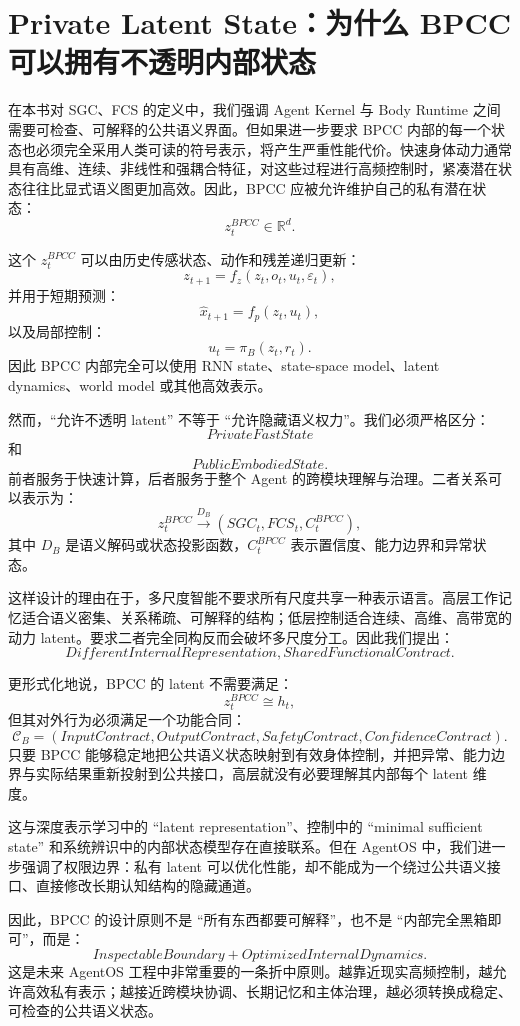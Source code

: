 \section{Private Latent State：为什么 BPCC 可以拥有不透明内部状态}

在本书对 SGC、FCS 的定义中，我们强调 Agent Kernel 与 Body Runtime 之间需要可检查、可解释的公共语义界面。但如果进一步要求 BPCC 内部的每一个状态也必须完全采用人类可读的符号表示，将产生严重性能代价。快速身体动力通常具有高维、连续、非线性和强耦合特征，对这些过程进行高频控制时，紧凑潜在状态往往比显式语义图更加高效。因此，BPCC 应被允许维护自己的私有潜在状态：
\[
\boxed{
z_t^{BPCC}
\in
\mathbb R^d.
}
\]

这个 $z_t^{BPCC}$ 可以由历史传感状态、动作和残差递归更新：
\[
z_{t+1}
=
f_z
\left(
z_t,
o_t,
u_t,
\varepsilon_t
\right),
\]
并用于短期预测：
\[
\hat x_{t+1}
=
f_p(z_t,u_t),
\]
以及局部控制：
\[
u_t
=
\pi_B(z_t,r_t).
\]
因此 BPCC 内部完全可以使用 RNN state、state-space model、latent dynamics、world model 或其他高效表示。

然而，``允许不透明 latent'' 不等于 ``允许隐藏语义权力''。我们必须严格区分：
\[
PrivateFastState
\]
和
\[
PublicEmbodiedState.
\]
前者服务于快速计算，后者服务于整个 Agent 的跨模块理解与治理。二者关系可以表示为：
\[
z_t^{BPCC}
\xrightarrow{D_B}
(
SGC_t,FCS_t,C_t^{BPCC}
),
\]
其中 $D_B$ 是语义解码或状态投影函数，$C_t^{BPCC}$ 表示置信度、能力边界和异常状态。

这样设计的理由在于，多尺度智能不要求所有尺度共享一种表示语言。高层工作记忆适合语义密集、关系稀疏、可解释的结构；低层控制适合连续、高维、高带宽的动力 latent。要求二者完全同构反而会破坏多尺度分工。因此我们提出：
\[
\boxed{
DifferentInternalRepresentation,
SharedFunctionalContract.
}
\]

更形式化地说，BPCC 的 latent 不需要满足：
\[
z_t^{BPCC}
\cong
h_t,
\]
但其对外行为必须满足一个功能合同：
\[
\mathcal C_B
=
(
InputContract,
OutputContract,
SafetyContract,
ConfidenceContract
).
\]
只要 BPCC 能够稳定地把公共语义状态映射到有效身体控制，并把异常、能力边界与实际结果重新投射到公共接口，高层就没有必要理解其内部每个 latent 维度。

这与深度表示学习中的 ``latent representation''、控制中的 ``minimal sufficient state'' 和系统辨识中的内部状态模型存在直接联系。但在 AgentOS 中，我们进一步强调了权限边界：私有 latent 可以优化性能，却不能成为一个绕过公共语义接口、直接修改长期认知结构的隐藏通道。

因此，BPCC 的设计原则不是 ``所有东西都要可解释''，也不是 ``内部完全黑箱即可''，而是：
\[
\boxed{
InspectableBoundary
+
OptimizedInternalDynamics.
}
\]
这是未来 AgentOS 工程中非常重要的一条折中原则。越靠近现实高频控制，越允许高效私有表示；越接近跨模块协调、长期记忆和主体治理，越必须转换成稳定、可检查的公共语义状态。


